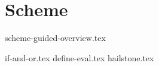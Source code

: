 \documentclass{exam}
\begin{document}
\section{Scheme}
{scheme-guided-overview.tex}
\begin{questions}
{if-and-or.tex}
{define-eval.tex}
{hailstone.tex}
\end{questions}
\end{document}

